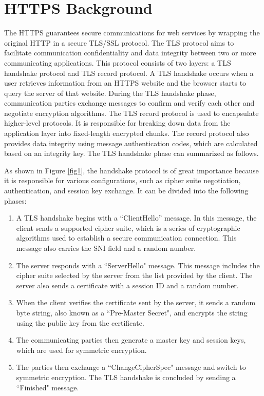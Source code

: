 \documentclass[preprint,12pt]{elsarticle}
\begin{document}
\section{HTTPS Background}
The HTTPS guarantees secure communications for web services by wrapping the original HTTP in a secure TLS/SSL protocol. The TLS protocol aims to facilitate communication confidentiality and data integrity between two or more communicating applications. This protocol consists of two layers: a TLS handshake protocol and TLS record protocol. A TLS handshake occurs when a user retrieves information from an HTTPS website and the browser starts to query the server of that website. During the TLS handshake phase, communication parties exchange messages to confirm and verify each other and negotiate encryption algorithms. The TLS record protocol is used to encapsulate higher-level protocols. It is responsible for breaking down data from the application layer into fixed-length encrypted chunks. The record protocol also provides data integrity using message authentication codes, which are calculated based on an integrity key. The TLS handshake phase can summarized as follows.

As shown in Figure \ref{fig1}, the handshake protocol is of great importance because it is responsible for various configurations, such as cipher suite negotiation, authentication, and session key exchange. It can be divided into the following phases:

\begin{enumerate}
\item
A TLS handshake begins with a ``ClientHello'' message. In this message, the client sends a supported cipher suite, which is a series of cryptographic algorithms used to establish a secure communication connection. This message also carries the SNI field and a random number.
\item
The server responds with a ``ServerHello" message. This message includes the cipher suite selected by the server from the list provided by the client. The server also sends a certificate with a session ID and a random number.
\item
When the client verifies the certificate sent by the server, it sends a random byte string, also known as a ``Pre-Master Secret", and encrypts the string using the public key from the certificate.
\item
The communicating parties then generate a master key and session keys, which are used for symmetric encryption.
\item
The parties then exchange a ``ChangeCipherSpec" message and switch to symmetric encryption. The TLS handshake is concluded by sending a ``Finished" message.
\end{enumerate}
\end{document}
